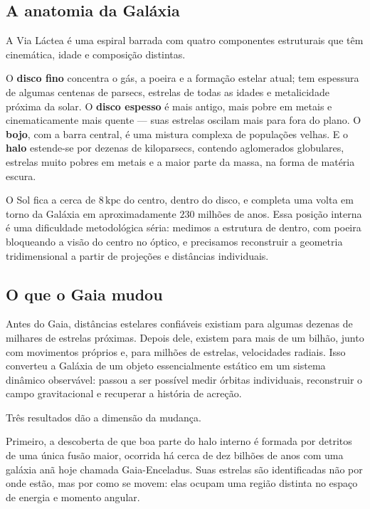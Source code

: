 \documentclass[11pt,a4paper]{article}
\begin{document}
\subsection*{A anatomia da Galáxia}

A Via Láctea é uma espiral barrada com quatro componentes estruturais que têm cinemática, idade e composição distintas.

O \textbf{disco fino} concentra o gás, a poeira e a formação estelar atual; tem espessura de algumas centenas de parsecs, estrelas de todas as idades e metalicidade próxima da solar. O \textbf{disco espesso} é mais antigo, mais pobre em metais e cinematicamente mais quente --- suas estrelas oscilam mais para fora do plano. O \textbf{bojo}, com a barra central, é uma mistura complexa de populações velhas. E o \textbf{halo} estende-se por dezenas de kiloparsecs, contendo aglomerados globulares, estrelas muito pobres em metais e a maior parte da massa, na forma de matéria escura.

O Sol fica a cerca de $8\,\mathrm{kpc}$ do centro, dentro do disco, e completa uma volta em torno da Galáxia em aproximadamente $230$ milhões de anos. Essa posição interna é uma dificuldade metodológica séria: medimos a estrutura de dentro, com poeira bloqueando a visão do centro no óptico, e precisamos reconstruir a geometria tridimensional a partir de projeções e distâncias individuais.

\subsection*{O que o Gaia mudou}

Antes do Gaia, distâncias estelares confiáveis existiam para algumas dezenas de milhares de estrelas próximas. Depois dele, existem para mais de um bilhão, junto com movimentos próprios e, para milhões de estrelas, velocidades radiais. Isso converteu a Galáxia de um objeto essencialmente estático em um sistema dinâmico observável: passou a ser possível medir órbitas individuais, reconstruir o campo gravitacional e recuperar a história de acreção.

Três resultados dão a dimensão da mudança.

Primeiro, a descoberta de que boa parte do halo interno é formada por detritos de uma única fusão maior, ocorrida há cerca de dez bilhões de anos com uma galáxia anã hoje chamada Gaia-Enceladus. Suas estrelas são identificadas não por onde estão, mas por como se movem: elas ocupam uma região distinta no espaço de energia e momento angular.
\end{document}
